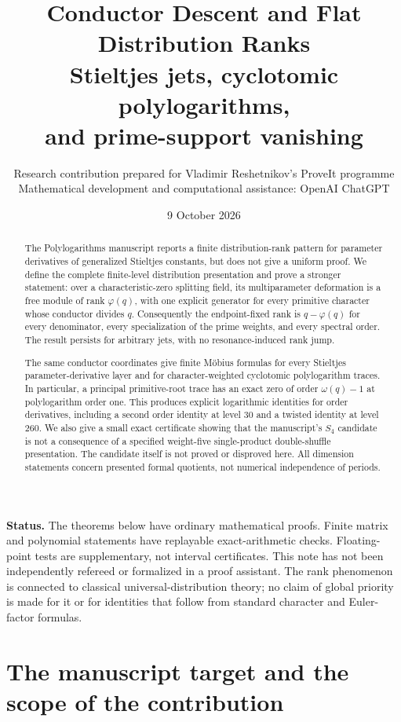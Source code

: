 \documentclass[11pt]{article}
\title{\textbf{Conductor Descent and Flat Distribution Ranks}\\[5pt]
\large Stieltjes jets, cyclotomic polylogarithms,\\and prime-support vanishing}
\author{Research contribution prepared for Vladimir Reshetnikov's ProveIt programme\\
\small Mathematical development and computational assistance: OpenAI ChatGPT}
\date{9 October 2026}
\numberwithin{equation}{section}
\theoremstyle{definition}\newtheorem{definition}[theorem]{Definition}
\theoremstyle{remark}\newtheorem{remark}[theorem]{Remark}
\begin{document}
\maketitle
\thispagestyle{empty}
\begin{abstract}
The Polylogarithms manuscript reports a finite distribution-rank pattern for
parameter derivatives of generalized Stieltjes constants, but does not give a
uniform proof. We define the complete finite-level distribution presentation
and prove a stronger statement: over a characteristic-zero splitting field,
its multiparameter deformation is a free module of rank $\varphi(q)$, with one
explicit generator for every primitive character whose conductor divides $q$.
Consequently the endpoint-fixed rank is $q-\varphi(q)$ for every denominator,
every specialization of the prime weights, and every spectral order. The
result persists for arbitrary jets, with no resonance-induced rank jump.

The same conductor coordinates give finite M\"obius formulas for every
Stieltjes parameter-derivative layer and for character-weighted cyclotomic
polylogarithm traces. In particular, a principal primitive-root trace has an
exact zero of order $\omega(q)-1$ at polylogarithm order one. This produces
explicit logarithmic identities for order derivatives, including a second
order identity at level $30$ and a twisted identity at level $260$.
We also give a small exact certificate showing that the manuscript's
$S_4$ candidate is not a consequence of a specified weight-five
single-product double-shuffle presentation. The candidate itself is not
proved or disproved here. All dimension statements concern presented formal
quotients, not numerical independence of periods.
\end{abstract}
\vspace{4pt}
\textbf{Status.} The theorems below have ordinary mathematical proofs.
Finite matrix and polynomial statements have replayable exact-arithmetic
checks. Floating-point tests are supplementary, not interval certificates.
This note has not been independently refereed or formalized in a proof assistant.
The rank phenomenon is connected to classical universal-distribution theory;
no claim of global priority is made for it or for identities that follow from
standard character and Euler-factor formulas.
\newpage
\setcounter{tocdepth}{1}
\tableofcontents
\newpage

\section{The manuscript target and the scope of the contribution}
\end{document}
